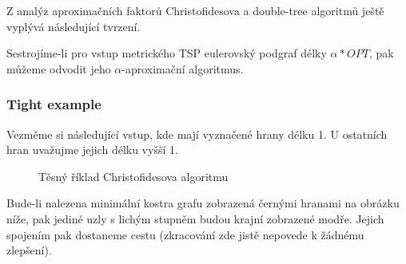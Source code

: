 \documentclass[
  printversion=false,
  joinlists=true,
  glossaries=true,
  figures=true,
  tables=true,
  sourcecodes=false,
  theorems=false,
  bibencoding=utf8,
  language=czech,
  encoding=utf8,
  program=infpvs,
  index=true,
  biblatex=true
]{kidiplom}
\begin{document}
	
	Z analýz aproximačních faktorů Christofidesova a double-tree algoritmů ještě vyplývá následující tvrzení.
\begin{lemma}
Sestrojíme-li pro vstup metrického TSP eulerovský podgraf délky $\alpha*OPT$, pak můžeme odvodit jeho $\alpha$-aproximační algoritmus.
\end{lemma}

\subsubsection{Tight example}
Vezměme si následující vstup, kde mají vyznačené hrany délku 1. U ostatních hran uvažujme jejich délku vyšší 1.

\begin{figure}[H]
    \begin{center}
    \end{center}
    \caption{Těsný říklad Christofidesova algoritmu}
\end{figure}

Bude-li nalezena minimální kostra grafu zobrazená černými hranami na obrázku níže, pak jediné uzly s lichým stupněm budou krajní zobrazené modře. Jejich spojením pak dostaneme cestu (zkracování zde jistě nepovede k žádnému zlepšení).
\end{document}

